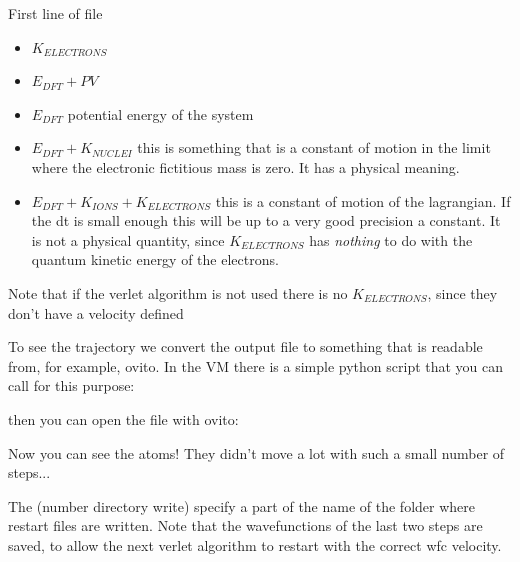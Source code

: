 \documentclass[landscape]{foils}
\begin{document}
First line of file
\begin{itemize}
	\item {} $K_{ELECTRONS}$
	\item {} $E_{DFT}+PV$ 
	\item {} $E_{DFT}$ potential energy of the system
	\item {} $E_{DFT} + K_{NUCLEI}$ this is something that is a constant of motion in the limit where the electronic fictitious mass is zero. It has a physical meaning.
	\item {} $E_{DFT} + K_{IONS} + K_{ELECTRONS}$ this is a constant of motion of the lagrangian. If the dt is small enough this will be up to a very good precision a constant. It is not a physical quantity, since $K_{ELECTRONS}$ has \emph{nothing} to do with the quantum kinetic energy of the electrons.
\end{itemize}

Note that if the verlet algorithm is not used there is no $K_{ELECTRONS}$, since they don't have a velocity defined

To see the trajectory we convert the output file to something that is readable from, for example, ovito. In the VM there is a simple python script that you can call for this purpose:


then you can open the file  with ovito:


Now you can see the atoms! They didn't move a lot with such a small number of steps...

The  (number directory write) specify a part of the name of the folder where restart files are written. Note that the wavefunctions of the last two steps are saved, to allow the next verlet algorithm to restart with the correct wfc velocity.


\end{document}
